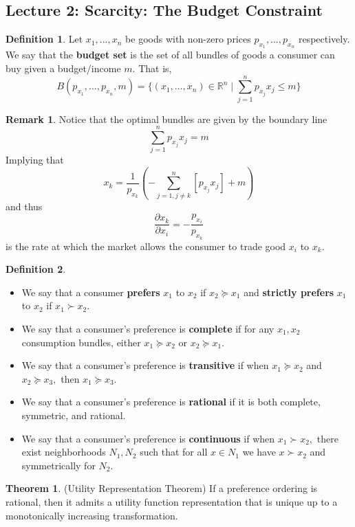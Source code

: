 \documentclass[10pt, oneside]{article}
\newcommand{\bbR}{\mathbb{R}}
\theoremstyle{definition}
\newtheorem{thm}{Theorem}
\newtheorem{defn}{Definition}
\newtheorem{rem}{Remark}
\begin{document}
\subsection*{Lecture 2: Scarcity: The Budget Constraint}
\begin{defn}
    Let $x_1, \dots, x_n$ be goods with non-zero prices $p_{x_1}, \dots, p_{x_n}$ respectively. We say that the \textbf{budget set} is the set of all bundles of goods a consumer can buy given a budget/income $m$. That is, 
    \[B(p_{x_1}, \dots, p_{x_n}, m) = \{(x_1, \dots, x_n)\in \bbR^n \mid \sum_{j=1}^n  p_{x_j}x_j \leq m\}\]
\end{defn}
\begin{rem}
    Notice that the optimal bundles are given by the boundary line 
    \[\sum_{j=1}^n  p_{x_j}x_j = m\] Implying that
    \[x_k = \frac{1}{p_{x_k}} \left(-\sum_{j=1, j \neq k}^n[p_{x_j}x_j] + m\right)  \] and thus 
    \[\frac{\partial x_k}{\partial x_i}=  -\frac{p_{x_i}}{p_{x_k}}\] is the rate at which the market allows the consumer to trade good $x_i$  to $x_k.$ 
\end{rem}
\begin{defn}
    \begin{itemize}
    Let $\succeq$ be a relation.
        \item We say that a consumer \textbf{prefers} $x_1$ to $x_2$ if $x_2 \succeq x_1$ and \textbf{strictly prefers} $x_1$ to $x_2$ if $x_1 \succ x_2.$  
        \item  We say that a consumer's preference is \textbf{complete} if for any $x_1, x_2$ consumption bundles, either $x_1 \succeq x_2$ or $x_2 \succeq x_1.$
        \item We say that a consumer's preference is \textbf{transitive} if  when $x_1 \succeq x_2$ and $x_2 \succeq x_3,$ then $x_1 \succeq x_3.$
        \item We say that a consumer's preference is \textbf{rational} if it is both complete, symmetric, and rational.
        \item We say that a consumer's preference is \textbf{continuous} if when $x_1 \succ x_2,$ there exist neighborhoods $N_1, N_2$ such that for all $x \in N_1$ we have $x \succ x_2$ and symmetrically for $N_2.$
    \end{itemize}
\end{defn}
\begin{thm}
    (Utility Representation Theorem) If a preference ordering is rational, then it admits a utility function representation that is unique up to a monotonically increasing transformation.
\end{thm}
\end{document}
